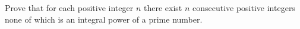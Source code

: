 Prove that for each positive integer $ n$ there exist $ n$ consecutive positive integers none of which is an integral power of a prime number.